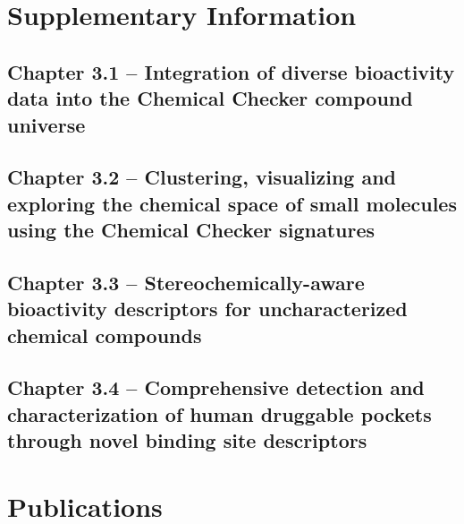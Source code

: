 \titleformat{\section}[block]
  {\normalfont\LARGE\bfseries}{\thesection}{1em}{}


\chapter{Supplementary Information}
\newpage


\clearpage
\section{Chapter 3.1 -- Integration of diverse bioactivity data into the Chemical Checker compound universe}




\clearpage
\section{Chapter 3.2 -- Clustering, visualizing and exploring the chemical space of small molecules using the Chemical Checker signatures}




\clearpage
\section{Chapter 3.3 -- Stereochemically-aware bioactivity descriptors for uncharacterized chemical compounds}


\clearpage
\section{Chapter 3.4 -- Comprehensive detection and characterization of human druggable pockets through novel binding site descriptors}




\chapter{Publications}
\newpage

